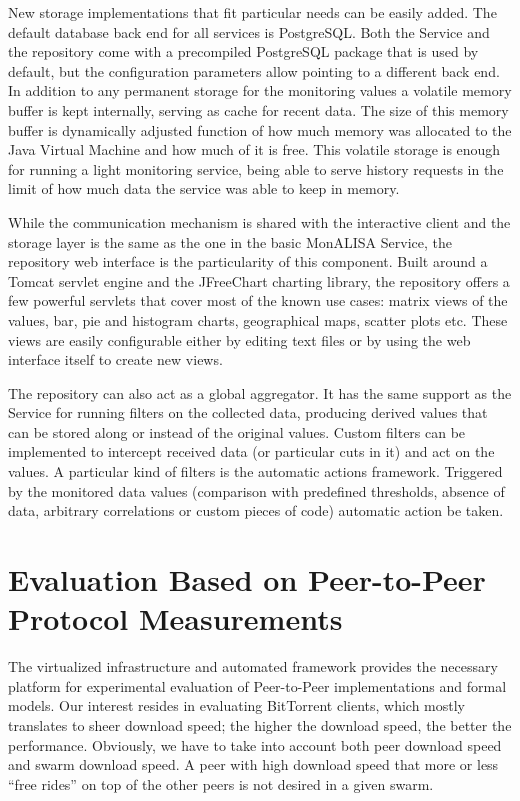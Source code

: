 New storage implementations that fit particular needs can be easily added. The
default database back end for all services is PostgreSQL. Both the Service and
the repository come with a precompiled PostgreSQL package that is used by
default, but the configuration parameters allow pointing to a different
back end. In addition to any permanent storage for the monitoring values a
volatile memory buffer is kept internally, serving as cache for recent data.
The size of this memory buffer is dynamically adjusted function of how much
memory was allocated to the Java Virtual Machine and how much of it is free.
This volatile storage is enough for running a light monitoring service, being
able to serve history requests in the limit of how much data the service was
able to keep in memory.

While the communication mechanism is shared with the interactive client and
the storage layer is the same as the one in the basic MonALISA Service, the
repository web interface is the particularity of this component. Built around
a Tomcat servlet engine and the JFreeChart charting library, the repository
offers a few powerful servlets that cover most of the known use cases: matrix
views of the values, bar, pie and histogram charts, geographical maps, scatter
plots etc. These views are easily configurable either by editing text files or
by using the web interface itself to create new views.

The repository can also act as a global aggregator. It has the same support as
the Service for running filters on the collected data, producing derived
values that can be stored along or instead of the original values. Custom
filters can be implemented to intercept received data (or particular cuts in
it) and act on the values. A particular kind of filters is the automatic
actions framework. Triggered by the monitored data values (comparison with
predefined thresholds, absence of data, arbitrary correlations or custom
pieces of code) automatic action be taken.

\section{Evaluation Based on Peer-to-Peer Protocol Measurements}
\label{sec:proto-measure:eval-swarm}

The virtualized infrastructure and automated framework provides the necessary
platform for experimental evaluation of Peer-to-Peer implementations and
formal models. Our interest resides in evaluating BitTorrent clients, which
mostly translates to sheer download speed; the higher the download speed, the
better the performance. Obviously, we have to take into account both peer
download speed and swarm download speed. A peer with high download speed that
more or less ``free rides'' on top of the other peers is not desired in a
given swarm.

